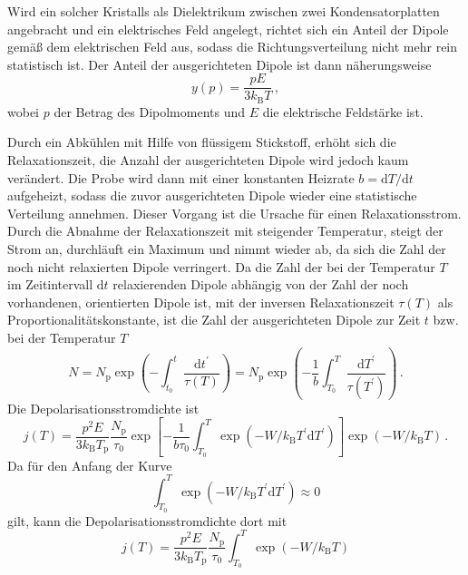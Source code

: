 Wird ein solcher Kristalls als Dielektrikum zwischen zwei Kondensatorplatten angebracht und ein elektrisches Feld angelegt, richtet sich ein Anteil der Dipole gemäß dem elektrischen Feld aus, sodass die Richtungsverteilung nicht mehr rein statistisch ist. Der Anteil der ausgerichteten Dipole ist dann näherungsweise
\begin{equation}
  y(p) = \frac{pE}{3k_\text{B}T}\,,
\end{equation}
wobei $p$ der Betrag des Dipolmoments und $E$ die elektrische Feldstärke ist.\par
Durch ein Abkühlen mit Hilfe von flüssigem Stickstoff, erhöht sich die Relaxationszeit, die Anzahl der ausgerichteten Dipole wird jedoch kaum verändert. Die Probe wird dann mit einer konstanten Heizrate $b = \text{d}T/\text{d}t$ aufgeheizt, sodass die zuvor ausgerichteten Dipole wieder eine statistische Verteilung annehmen. Dieser Vorgang ist die Ursache für einen Relaxationsstrom. Durch die Abnahme der Relaxationszeit mit steigender Temperatur, steigt der Strom an, durchläuft ein Maximum und nimmt wieder ab, da sich die Zahl der noch nicht relaxierten Dipole verringert.
Da die Zahl der bei der Temperatur $T$ im Zeitintervall $\text{d}t$ relaxierenden Dipole abhängig von der Zahl der noch vorhandenen, orientierten Dipole ist, mit der inversen Relaxationszeit $\tau(T)$ als Proportionalitätskonstante, ist die Zahl der ausgerichteten Dipole zur Zeit $t$ bzw. bei der Temperatur $T$
\begin{equation}
  N = N_\text{p} \exp{\left( - \int_{t_0}^{t} \frac{\text{d}t^\prime}{\tau(T)} \right)} = N_\text{p} \exp{\left( - \frac{1}{b} \int_{T_0}^{T} \frac{\text{d}T^\prime}{\tau(T^\prime)} \right)}\,.
\end{equation}
Die Depolarisationsstromdichte ist
\begin{equation}
  j(T) = \frac{p^2E}{3k_\text{B}T_\text{p}} \frac{N_\text{p}}{\tau_0} \exp{\left[ -\frac{1}{b\tau_0}\int_{T_0}^{T} \exp{\left( -W / k_\text{B}T^\prime \text{d}T^\prime \right)} \right]} \exp{\left( -W / k_\text{B}T \right)}\,.
  \label{eq:stromdichte}
\end{equation}
Da für den Anfang der Kurve
\begin{equation}
  \int_{T_0}^{T} \exp{\left( -W / k_\text{B}T^\prime \text{d}T^\prime \right)} \approx 0
\end{equation}
gilt, kann die Depolarisationsstromdichte dort mit
\begin{equation}
  j(T) = \frac{p^2E}{3k_\text{B}T_\text{p}} \frac{N_\text{p}}{\tau_0} \int_{T_0}^{T} \exp{\left( -W / k_\text{B}T \right)}
  \label{eq:meth1}
\end{equation}
